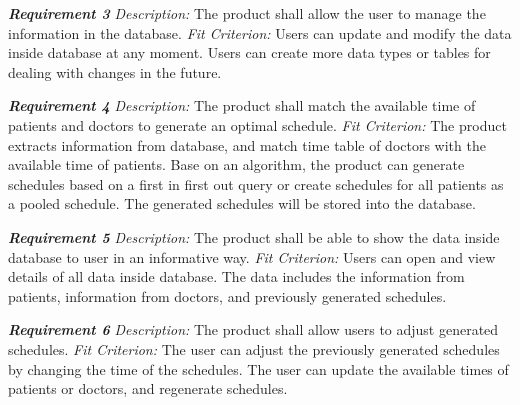 \documentclass[12pt, titlepage]{article}
\begin{document}
\noindent\textbf{\textit{Requirement 3}}\newline
\textit{Description:}\newline
The product shall allow the user to manage the information in the database. \newline\newline
\textit{Fit Criterion:}\newline 
Users can update and modify the data inside database at any moment. Users can create more data types or tables for dealing with changes in the future.
\newline

\noindent\textbf{\textit{Requirement 4}}\newline
\textit{Description:}\newline
The product shall match the available time of patients and doctors to generate an optimal schedule. \newline\newline
\textit{Fit Criterion:}\newline 
The product extracts information from database, and match time table of doctors with the available time of patients. Base on an algorithm, the product can generate schedules based on a first in first out query or create schedules for all patients as a pooled schedule. The generated schedules will be stored into the database. \newline

\noindent\textbf{\textit{Requirement 5}}\newline
\textit{Description:}\newline
The product shall be able to show the data inside database to user in an informative way. \newline\newline
\textit{Fit Criterion:}\newline 
Users can open and view details of all data inside database. The data includes the information from patients, information from doctors, and previously generated schedules. \newline

\noindent\textbf{\textit{Requirement 6}}\newline
\textit{Description:}\newline
The product shall allow users to adjust generated schedules. \newline\newline
\textit{Fit Criterion:}\newline 
The user can adjust the previously generated schedules by changing the time of the schedules. The user can update the available times of patients or doctors, and regenerate schedules. \newline
\end{document}
